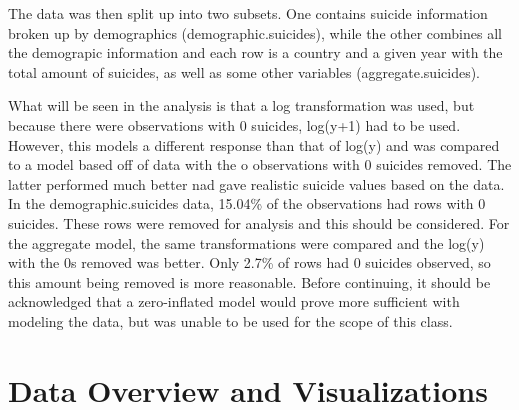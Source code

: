 \documentclass[11pt,]{article}
\begin{document}
The data was then split up into two subsets. One contains suicide
information broken up by demographics (demographic.suicides), while the
other combines all the demograpic information and each row is a country
and a given year with the total amount of suicides, as well as some
other variables (aggregate.suicides).

What will be seen in the analysis is that a log transformation was used,
but because there were observations with 0 suicides, log(y+1) had to be
used. However, this models a different response than that of log(y) and
was compared to a model based off of data with the o observations with 0
suicides removed. The latter performed much better nad gave realistic
suicide values based on the data. In the demographic.suicides data,
15.04\% of the observations had rows with 0 suicides. These rows were
removed for analysis and this should be considered. For the aggregate
model, the same transformations were compared and the log(y) with the 0s
removed was better. Only 2.7\% of rows had 0 suicides observed, so this
amount being removed is more reasonable. Before continuing, it should be
acknowledged that a zero-inflated model would prove more sufficient with
modeling the data, but was unable to be used for the scope of this
class.

\hypertarget{data-overview-and-visualizations}{%
\section{Data Overview and
Visualizations}\label{data-overview-and-visualizations}}
\end{document}
